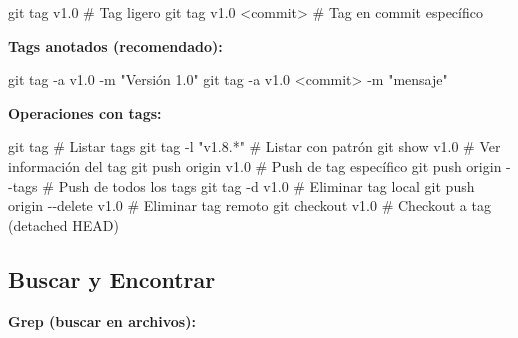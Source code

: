 \documentclass[
  doc,
  floatsintext,
  longtable,
  a4paper,
  nolmodern,
  notxfonts,
  notimes,
  12pt,
  colorlinks=true,linkcolor=blue,citecolor=blue,urlcolor=blue]{apa7}
\newenvironment{Shaded}{\begin{snugshade}}{\end{snugshade}}
\newcommand{\AttributeTok}[1]{\textcolor[rgb]{0.40,0.45,0.13}{#1}}
\newcommand{\CommentTok}[1]{\textcolor[rgb]{0.37,0.37,0.37}{#1}}
\newcommand{\FunctionTok}[1]{\textcolor[rgb]{0.28,0.35,0.67}{#1}}
\newcommand{\NormalTok}[1]{\textcolor[rgb]{0.00,0.23,0.31}{#1}}
\newcommand{\OperatorTok}[1]{\textcolor[rgb]{0.37,0.37,0.37}{#1}}
\newcommand{\StringTok}[1]{\textcolor[rgb]{0.13,0.47,0.30}{#1}}
\begin{document}
\begin{Shaded}
\begin{Highlighting}[]
\FunctionTok{git}\NormalTok{ tag v1.0               }\CommentTok{\# Tag ligero}
\FunctionTok{git}\NormalTok{ tag v1.0 }\OperatorTok{\textless{}}\NormalTok{commit}\OperatorTok{\textgreater{}}      \CommentTok{\# Tag en commit específico}
\end{Highlighting}
\end{Shaded}

\textbf{Tags anotados (recomendado):}

\begin{Shaded}
\begin{Highlighting}[]
\FunctionTok{git}\NormalTok{ tag }\AttributeTok{{-}a}\NormalTok{ v1.0 }\AttributeTok{{-}m} \StringTok{"Versión 1.0"}
\FunctionTok{git}\NormalTok{ tag }\AttributeTok{{-}a}\NormalTok{ v1.0 }\OperatorTok{\textless{}}\NormalTok{commit}\OperatorTok{\textgreater{}}\NormalTok{ {-}m }\StringTok{"mensaje"}
\end{Highlighting}
\end{Shaded}

\textbf{Operaciones con tags:}

\begin{Shaded}
\begin{Highlighting}[]
\FunctionTok{git}\NormalTok{ tag                    }\CommentTok{\# Listar tags}
\FunctionTok{git}\NormalTok{ tag }\AttributeTok{{-}l} \StringTok{"v1.8.*"}        \CommentTok{\# Listar con patrón}
\FunctionTok{git}\NormalTok{ show v1.0              }\CommentTok{\# Ver información del tag}
\FunctionTok{git}\NormalTok{ push origin v1.0       }\CommentTok{\# Push de tag específico}
\FunctionTok{git}\NormalTok{ push origin }\AttributeTok{{-}{-}tags}     \CommentTok{\# Push de todos los tags}
\FunctionTok{git}\NormalTok{ tag }\AttributeTok{{-}d}\NormalTok{ v1.0            }\CommentTok{\# Eliminar tag local}
\FunctionTok{git}\NormalTok{ push origin }\AttributeTok{{-}{-}delete}\NormalTok{ v1.0  }\CommentTok{\# Eliminar tag remoto}
\FunctionTok{git}\NormalTok{ checkout v1.0          }\CommentTok{\# Checkout a tag (detached HEAD)}
\end{Highlighting}
\end{Shaded}

\subsection{Buscar y Encontrar}\label{buscar-y-encontrar}

\textbf{Grep (buscar en archivos):}
\end{document}
